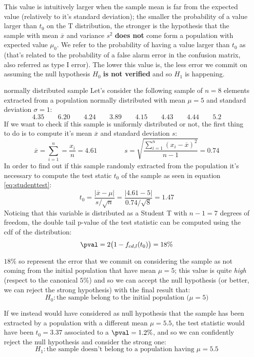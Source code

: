 	This value is intuitively larger when the sample mean is far from the expected value (relatively to it's standard deviation); the smaller the probability of a value larger than $t_0$ on the T distribution, the stronger is the hypothesis that the sample with mean $\overline x$ and variance $s^2$ \textbf{does not} come form a population with expected value $\mu_0$. We refer to the probability of having a value larger than $t_0$ as  (that's related to the probability of a false alarm error in the confusion matrix, also referred as type I error). The lower this value is, the less error we commit on assuming the null hypothesis $H_0$ \textbf{is not verified} and so $H_1$ is happening.
		
	\begin{example}{normally distributed sample}
		Let's consider the following sample of $n=8$ elements extracted from a population normally distributed with mean $\mu = 5$ and standard deviation $\sigma = 1$:
		\[ 4.35 \qquad 6.20 \qquad 4.24 \qquad 3.89 \qquad 4.15 \qquad 4.43 \qquad 4.44 \qquad 5.2 \]
		If we want to check if this sample is uniformly distributed or not, the first thing to do is to compute it's mean $\overline x$ and standard deviation $s$:
		\[ \overline x = \sum_{i=1}^n = \frac{x_i}{n} = 4.61 \qquad \qquad s = \sqrt{ \frac{\sum_{i=1}^n (x_i-\overline x)^2 }{n-1}} = 0.74  \]
		In order to find out if this sample randomly extracted from the population it's necessary to compute the test static $t_0$ of the sample as seen in equation \ref{eq:studenttest}:
		\[ t_0 = \frac{|\overline x - \mu|}{s/\sqrt n} = \frac{|4.61-5|}{0.74/\sqrt{8}} = 1.47 \]
		Noticing that this variable is distributed as a Student T with $n-1=7$ degrees of freedom, the double tail p-value of the test statistic can be computed using the cdf of the distribution:
		\[ \pval = 2 \big(1-f_{cd,l}(t_0)\big) = 18\% \]
		
		$18\%$ so represent the error that we commit on considering the sample as not coming from the initial population that have mean $\mu = 5$; this value is quite \textit{high} (respect to the canonical $5\%$) and so we can accept the null hypothesis (or better, we can reject the strong hypothesis) with the final result that:
		\[ H_0 : \textrm{the sample belong to the initial population ($\mu = 5$)} \]
		
		If we instead would have considered as null hypothesis that the sample has been extracted by a population with a different mean $\mu = 5.5$, the test statistic would have been $t_0 = 3.37$ associated to a $\pval = 1.2\%$, and so we can confidently reject the null hypothesis and consider the strong one:
		\[ H_1 : \textrm{the sample doesn't belong to a population having $\mu = 5.5$} \]
		
	\end{example}
	
